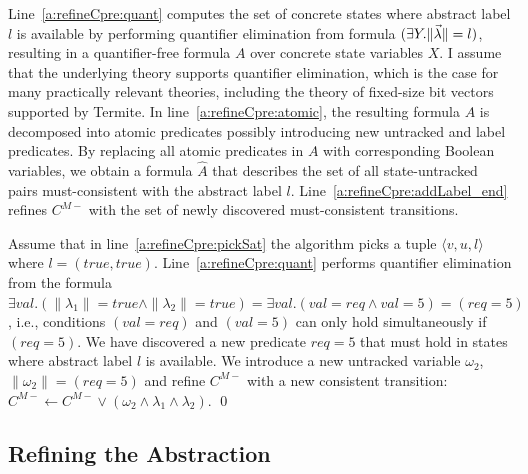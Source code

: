 Line~\ref{a:refineCpre:quant} computes the set of concrete states where abstract label $l$ is available by performing quantifier elimination from formula $(\exists Y.\|\vec{\lambda}\|=l)$, resulting in a quantifier-free formula $A$ over concrete state variables $X$.  I assume that the underlying theory supports quantifier elimination, which is the case for many practically relevant theories, including the theory of fixed-size bit vectors supported by Termite.  In line~\ref{a:refineCpre:atomic}, the resulting formula $A$ is decomposed into atomic predicates possibly introducing new untracked and label predicates.  By replacing all atomic predicates in $A$ with corresponding Boolean variables, we obtain a formula $\hat{A}$ that describes the set of all state-untracked pairs must-consistent with the abstract label $l$.  Line~\ref{a:refineCpre:addLabel_end} refines $C^{M-}$ with the set of newly discovered must-consistent transitions.


\begin{ex}
    \everymath{\mathtt{\xdef\tmp{\fam\the\fam\relax}\aftergroup\tmp}}
    \everydisplay{\mathtt{\xdef\tmp{\fam\the\fam\relax}\aftergroup\tmp}}
    Assume that in line~\ref{a:refineCpre:pickSat} the algorithm picks a tuple $\langle v,u,l\rangle$ where $l=(true, true)$.  Line~\ref{a:refineCpre:quant} performs quantifier elimination from the formula $\exists val. (\|\lambda_1\|=true \land  \|\lambda_2\|=true) = \exists val. (val=req \land val=5) = (req=5)$, i.e., conditions $(val=req)$ and $(val=5)$ can only hold simultaneously if $(req=5)$. We have discovered a new predicate $req=5$ that must hold in states where abstract label $l$ is available.  We introduce a new untracked variable $\omega_2$, $\|\omega_2\|=(req=5)$ and refine $C^{M-}$ with a new consistent transition: $C^{M-} \gets C^{M-} \lor (\omega_2 \land \lambda_1 \land \lambda_2)$.
    \qed
\end{ex}

\subsection{Refining the Abstraction}
\label{sec:refineAbstraction}

